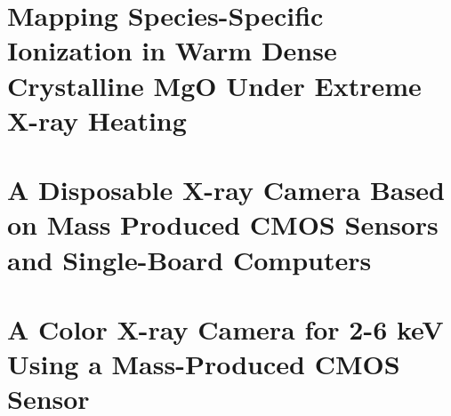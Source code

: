 \documentclass [11pt, proquest, article] {uwthesis}[2016/11/22]
\begin{document}
\chapter{ Mapping Species-Specific Ionization in Warm Dense Crystalline MgO Under
Extreme X-ray Heating }
\label{chap:mgo}


\chapter{A Disposable X-ray Camera Based on Mass Produced CMOS Sensors and
Single-Board Computers}
\label{cmos_ch}


\chapter{A Color X-ray Camera for 2-6 keV Using a Mass-Produced CMOS Sensor}
\label{chap:cmos_ch2}





\cleardoublepage
\printbibliography[heading=bibintoc, title={References}]
\end{document}
